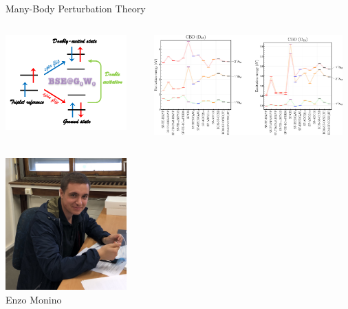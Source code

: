 \documentclass[aspectratio=169,9pt]{beamer}
\begin{document}
\begin{frame}{Many-Body Perturbation Theory}
        \begin{columns}
                \begin{column}{0.4\textwidth}
                        \centering
                        \includegraphics[width=0.90\textwidth]{fig/spin_flip_BSE_TOC.pdf}
                \end{column}
                \begin{column}{0.6\textwidth}
                        \centering
                        \includegraphics[width=0.95\textwidth]{fig/CDB_Enzo.jpeg}
                \end{column}
        \end{columns}
        \begin{columns}
        \begin{column}{0.50\textwidth}
\centering
\includegraphics[width=0.35\textwidth]{fig/Enzo}
\\
Enzo Monino
        \end{column}


\end{columns}
\end{frame}
\end{document}
